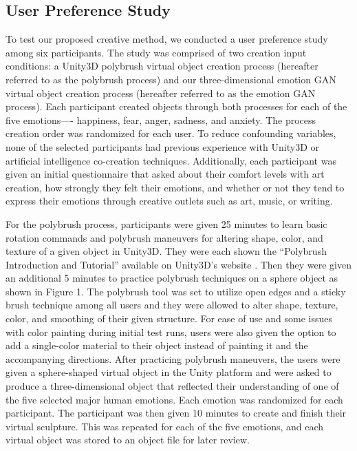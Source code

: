 \documentclass{sigchi}
\begin{document}
\subsection{User Preference Study}
To test our proposed creative method, we conducted a user preference study among six participants. The study was comprised of two creation input conditions: a Unity3D polybrush virtual object creation process (hereafter referred to as the polybrush process) and our three-dimensional emotion GAN virtual object creation process (hereafter referred to as the emotion GAN process). Each participant created objects through both processes for each of the five emotions---- happiness, fear, anger, sadness, and anxiety. The process creation order was randomized for each user. To reduce confounding variables, none of the selected participants had previous experience with Unity3D or artificial intelligence co-creation techniques. Additionally, each participant was given an initial questionnaire that asked about their comfort levels with art creation, how strongly they felt their emotions, and whether or not they tend to express their emotions through creative outlets such as art, music, or writing.

For the polybrush process, participants were given 25 minutes to learn basic rotation commands and polybrush maneuvers for altering shape, color, and texture of a given object in Unity3D. They were each shown the “Polybrush Introduction and Tutorial” available on Unity3D’s website \cite{polybrush}. Then they were given an additional 5 minutes to practice polybrush techniques on a sphere object as shown in Figure 1. The polybrush tool was set to utilize open edges and a sticky brush technique among all users and they were allowed to alter shape, texture, color, and smoothing of their given structure. For ease of use and some issues with color painting during initial test runs, users were also given the option to add a single-color material to their object instead of painting it and the accompanying directions. After practicing polybrush maneuvers, the users were given a sphere-shaped virtual object in the Unity platform and were asked to produce a three-dimensional object that reflected their understanding of one of the five selected major human emotions. Each emotion was randomized for each participant. The participant was then given 10 minutes to create and finish their virtual sculpture. This was repeated for each of the five emotions, and each virtual object was stored to an object file for later review.
\end{document}
